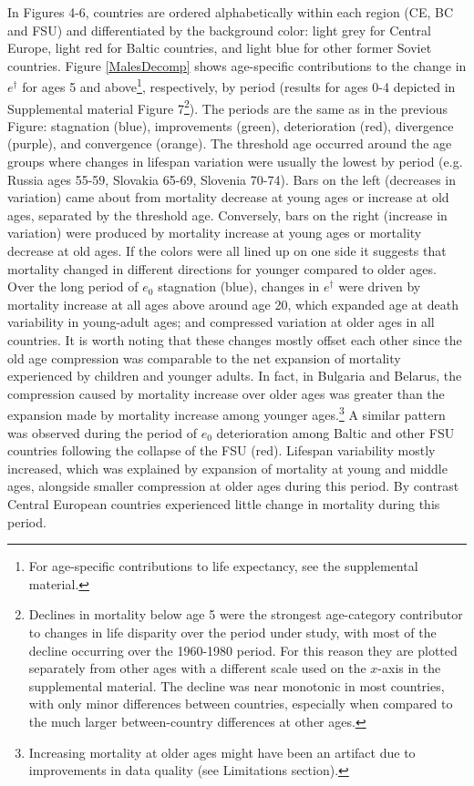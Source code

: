 \documentclass{article}
\begin{document}
\begin{spacing}{1.5}
In Figures 4-6, countries are ordered alphabetically within each region (CE, BC and FSU) and differentiated by the background color: light grey for Central Europe, light red for Baltic countries, and light blue for other former Soviet countries. Figure  \ref{MalesDecomp} shows age-specific contributions to the change in $e^\dagger$ for ages 5 and above\footnote{For age-specific contributions to life expectancy, see the supplemental material.}, respectively, by period (results for ages 0-4 depicted in Supplemental material Figure 7\footnote{Declines in mortality below age 5 were the strongest age-category contributor to changes in life disparity over the period under study, with most of the decline occurring over the 1960-1980 period. For this reason they are plotted separately from other ages with a different scale used on the $x$-axis in the supplemental material. The decline was near monotonic in most countries, with only minor differences between countries, especially when compared to the much larger between-country differences at other ages.}). The periods are the same as in the previous Figure:  stagnation (blue), improvements (green), deterioration (red), divergence (purple), and convergence (orange). The threshold age occurred around the age groups where changes in lifespan variation were usually the lowest by period (e.g. Russia ages 55-59, Slovakia 65-69, Slovenia 70-74). Bars on the left (decreases in variation) came about from mortality decrease at young ages or increase at old ages, separated by the threshold age. Conversely, bars on the right (increase in variation) were produced by mortality increase at young ages or mortality decrease at old ages. If the colors were all lined up on one side it suggests that mortality changed in different directions for younger compared to older ages. \\


Over the long period of $e_0$ stagnation (blue), changes in $e^\dagger$ were driven by mortality increase at all ages above around age 20, which expanded age at death variability in young-adult ages; and compressed variation at older ages in all countries. It is worth noting that these changes mostly offset each other since the old age compression was comparable to the net expansion of mortality experienced by children and younger adults. In fact, in Bulgaria and Belarus, the compression caused by mortality increase over older ages was greater than the expansion made by mortality increase among younger ages.\footnote{Increasing mortality at older ages might have been an artifact due to improvements in data quality (see Limitations section).} A similar pattern was observed during the period of $e_0$ deterioration among Baltic and other FSU countries following the collapse of the FSU (red). Lifespan variability mostly increased, which was explained by expansion of mortality at young and middle ages, alongside smaller compression at older ages during this period. By contrast Central European countries experienced little change in mortality during this period.\\


\end{spacing}
\end{document}
